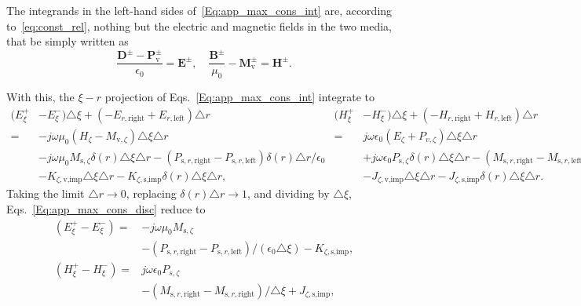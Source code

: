 \documentclass[journal,transaction]{IEEEtran}
\newcommand{\ve}[1]{\mathbf{#1}}
\begin{document}
The integrands in the left-hand sides of~\eqref{Eq:app_max_cons_int} are, according to~\eqref{eq:const_rel}, nothing but the electric and magnetic fields in the two media, that be simply written as
%
\begin{equation}
\frac{\ve{D}^\pm-\ve{P}^\pm_\text{v}}{\epsilon_0}=\ve{E}^\pm,\quad \frac{\ve{B}^\pm}{\mu_0}-\ve{M}^\pm_\text{v}=\ve{H}^\pm.
\end{equation}

With this, the $\xi-r$ projection of Eqs.~\eqref{Eq:app_max_cons_int} integrate to
%
\begin{subequations}\label{Eq:app_max_cons_disc}
\begin{equation}
\begin{split}
(E_\xi^+&-E_\xi^-)\triangle \xi+ (-E_{r,\text{right}}+E_{r,\text{left}})\triangle r\\
=&-j\omega\mu_0(H_\zeta -M_{\text{v},\zeta}) \triangle \xi \triangle r\\
&-j\omega\mu_0M_{\text{s},\zeta}\delta(r)\triangle \xi \triangle r-(P_{\text{s},r,\text{right}}-P_{\text{s},r,\text{left}})\delta(r)\triangle r/\epsilon_0\\
&-K_{\zeta,\text{v,imp}}\triangle \xi \triangle r-K_{\zeta,\text{s,imp}}\delta(r)\triangle \xi \triangle r,
\end{split}
\end{equation}
\begin{equation}
\begin{split}
(H_\xi^+&-H_\xi^-)\triangle \xi+ (-H_{r,\text{right}}+H_{r,\text{left}})\triangle r\\
=&j\omega\epsilon_0(E_\zeta+P_{v,\zeta}) \triangle \xi \triangle r\\
&+j\omega\epsilon_0P_{\text{s},\zeta}\delta(r) \triangle \xi \triangle r-(M_{\text{s},r,\text{right}}-M_{\text{s},r,\text{left}})\delta(r)\triangle r\\
&-J_{\zeta,\text{v,imp}}\triangle \xi \triangle r-J_{\zeta,\text{s,imp}}\delta(r)\triangle \xi \triangle r.
\end{split}
\end{equation}
\end{subequations}
%
Taking the limit $\triangle r \rightarrow 0$, replacing $\delta(r)\triangle r\rightarrow 1$, and dividing by $\triangle\xi$, Eqs.~\eqref{Eq:app_max_cons_disc} reduce to
%
\begin{subequations}\label{Eq:app_max_discon}
\begin{equation}
\begin{split}
(E_\xi^+-E_\xi^-)=&-j\omega\mu_0M_{\text{s},\zeta}\\
&-(P_{\text{s},r,\text{right}}-P_{\text{s},r,\text{left}})/ (\epsilon_0\triangle \xi)-K_{\zeta,\text{s,imp}},\\
(H_\xi^+-H_\xi^-)=&j\omega\epsilon_0P_{s,\zeta}\\
&-(M_{\text{s},r,\text{right}}-M_{\text{s},r,\text{right}})/\triangle \xi+J_{\zeta,\text{s,imp}},
\end{split}
\end{equation}
\end{subequations}
\end{document}
